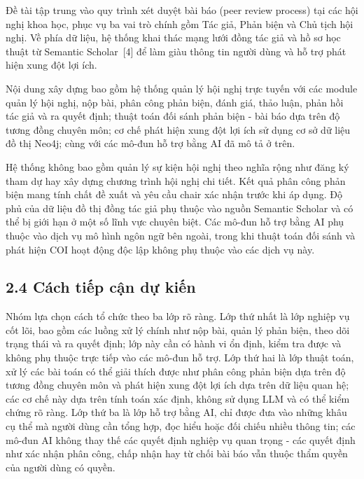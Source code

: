 Đề tài tập trung vào quy trình xét duyệt bài báo (peer review process) tại các hội nghị khoa học, phục vụ ba vai trò chính gồm Tác giả, Phản biện và Chủ tịch hội nghị. Về phía dữ liệu, hệ thống khai thác mạng lưới đồng tác giả và hồ sơ học thuật từ Semantic Scholar~[4] để làm giàu thông tin người dùng và hỗ trợ phát hiện xung đột lợi ích.

Nội dung xây dựng bao gồm hệ thống quản lý hội nghị trực tuyến với các module quản lý hội nghị, nộp bài, phân công phản biện, đánh giá, thảo luận, phản hồi tác giả và ra quyết định; thuật toán đối sánh phản biện - bài báo dựa trên độ tương đồng chuyên môn; cơ chế phát hiện xung đột lợi ích sử dụng cơ sở dữ liệu đồ thị Neo4j; cùng với các mô-đun hỗ trợ bằng AI đã mô tả ở trên.

Hệ thống không bao gồm quản lý sự kiện hội nghị theo nghĩa rộng như đăng ký tham dự hay xây dựng chương trình hội nghị chi tiết. Kết quả phân công phản biện mang tính chất đề xuất và yêu cầu chair xác nhận trước khi áp dụng. Độ phủ của dữ liệu đồ thị đồng tác giả phụ thuộc vào nguồn Semantic Scholar và có thể bị giới hạn ở một số lĩnh vực chuyên biệt. Các mô-đun hỗ trợ bằng AI phụ thuộc vào dịch vụ mô hình ngôn ngữ bên ngoài, trong khi thuật toán đối sánh và phát hiện COI hoạt động độc lập không phụ thuộc vào các dịch vụ này.

\subsection*{2.4 Cách tiếp cận dự kiến}

Nhóm lựa chọn cách tổ chức theo ba lớp rõ ràng. Lớp thứ nhất là lớp nghiệp vụ cốt lõi, bao gồm các luồng xử lý chính như nộp bài, quản lý phản biện, theo dõi trạng thái và ra quyết định; lớp này cần có hành vi ổn định, kiểm tra được và không phụ thuộc trực tiếp vào các mô-đun hỗ trợ. Lớp thứ hai là lớp thuật toán, xử lý các bài toán có thể giải thích được như phân công phản biện dựa trên độ tương đồng chuyên môn và phát hiện xung đột lợi ích dựa trên dữ liệu quan hệ; các cơ chế này dựa trên tính toán xác định, không sử dụng LLM và có thể kiểm chứng rõ ràng. Lớp thứ ba là lớp hỗ trợ bằng AI, chỉ được đưa vào những khâu cụ thể mà người dùng cần tổng hợp, đọc hiểu hoặc đối chiếu nhiều thông tin; các mô-đun AI không thay thế các quyết định nghiệp vụ quan trọng - các quyết định như xác nhận phân công, chấp nhận hay từ chối bài báo vẫn thuộc thẩm quyền của người dùng có quyền.

